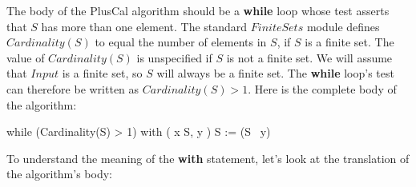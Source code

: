 The body of the PlusCal algorithm should be a \textbf{while} loop
whose test asserts that $S$ has more than one element.  The standard
$FiniteSets$ module defines
  $Cardinality(S)$ to equal the
number of elements in $S$, if $S$ is a finite set.  The value of
$Cardinality(S)$ is unspecified if $S$ is not a finite set.  
We will assume that $Input$ is a finite set, so $S$ will always
be a finite set.  The \textbf{while} loop's test can therefore
be written as $Cardinality(S) > 1$.  Here is the complete
body of the algorithm:%
\begin{display}
\begin{nopcal}
while (Cardinality(S) > 1) 
  {  with (  x \in S,  y   ) 
       {  S := (S \ {y})   }
  }
\end{nopcal}
\begin{tlatex}
%
%
\end{tlatex}
\end{display}
To understand the meaning of the \textbf{with} statement, let's look at
the translation of the algorithm's body:

